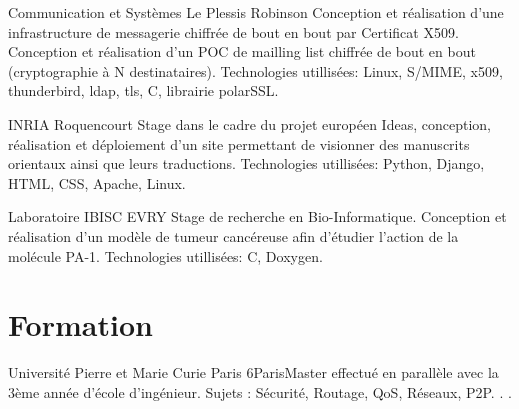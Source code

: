 \documentclass[11pt,a4paper]{moderncv}
\begin{document}
              {Communication et Systèmes}
              {Le Plessis Robinson}
              {}
              {Conception et réalisation d'une infrastructure de messagerie chiffrée de bout en bout par
               Certificat X509. Conception et réalisation d'un POC de mailling list chiffrée de bout en bout
               (cryptographie à N destinataires).
               \newline Technologies utillisées: Linux, S/MIME, x509, thunderbird, ldap, tls, C, librairie polarSSL.
              }



              {INRIA}
              {Roquencourt}
              {}
              {Stage dans le cadre du projet européen Ideas, 
                 conception, réalisation et déploiement d'un site permettant de visionner 
                 des manuscrits orientaux ainsi que leurs traductions.
                 \newline Technologies utillisées: Python, Django, HTML, CSS, Apache, Linux.
              }

              {Laboratoire IBISC}
              {EVRY}
              {}
              {Stage de recherche en Bio-Informatique. Conception
                et réalisation d'un modèle de tumeur
                cancéreuse afin d'étudier l'action de la molécule PA-1.
                \newline Technologies utillisées: C, Doxygen.
              }



\section{Formation}
{Université Pierre et Marie Curie Paris 6}{Paris}{}{Master effectué en parallèle avec la 3ème année d’école d’ingénieur. Sujets : Sécurité, Routage,
QoS, Réseaux, P2P. . .}
\end{document}
